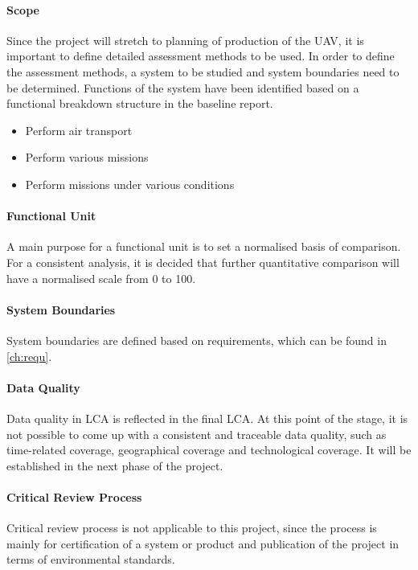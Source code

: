 \paragraph{Scope} Since the project will stretch to planning of production of the UAV, it is important to define detailed assessment methods to be used. In order to define the assessment methods, a system to be studied and system boundaries need to be determined. Functions of the system have been identified based on a functional breakdown structure in the baseline report\cite{baseline}. 

\begin{itemize}
    \item Perform air transport
    \item Perform various missions
    \item Perform missions under various conditions
\end{itemize}

\paragraph{Functional Unit}
A main purpose for a functional unit is to set a normalised basis of comparison. For a consistent analysis, it is decided that further quantitative comparison will have a normalised scale from 0 to 100.

\paragraph{System Boundaries}
System boundaries are defined based on requirements, which can be found in \autoref{ch:requ}.

\paragraph{Data Quality}
Data quality in LCA is reflected in the final LCA. At this point of the stage, it is not possible to come up with a consistent and traceable data quality, such as time-related coverage, geographical coverage and technological coverage\cite{lca}. It will be established in the next phase of the project. 

\paragraph{Critical Review Process}
Critical review process is not applicable to this project, since the process is mainly for certification of a system or product and publication of the project in terms of environmental standards.

